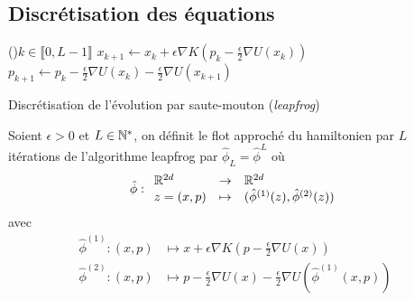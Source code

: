 \documentclass[10pt,a4paper]{article}
\begin{document}
\subsection{Discrétisation des équations}




\begin{center}
	\begin{algorithm}[H]
		\For(){$k \in \llbracket 0, L-1 \rrbracket$}{
			$x_{k+1} \leftarrow x_k + \epsilon \nabla K \left( p_k - \frac{\epsilon}{2} \nabla U(x_k) \right)$\;
			$p_{k+1} \leftarrow p_k - \frac{\epsilon}{2} \nabla U(x_k) - \frac{\epsilon}{2} \nabla U(x_{k+1})$\;
		}
		\caption{Discrétisation de l'évolution par saute-mouton (\emph{leapfrog})}
		\label{algo:leapfrog}
	\end{algorithm}
\end{center}

\begin{Def} \label{def:flot_approche}
	Soient $\epsilon > 0$ et $L \in \mathbb{N}^*$, on définit le flot approché du hamiltonien par $L$ itérations de l'algorithme leapfrog par $\hat{\phi}_L = \hat{\phi}^L$ où 
	$$
	\hat{\phi} : { \begin{array}{lcl} \mathbb{R}^{2d} & \to & \mathbb{R}^{2d} \\
	z = (x, p) & \mapsto & (\hat{\phi}^{(1)}(z), \hat{\phi}^{(2)}(z))
	 \end{array} }
	$$
	avec
	\begin{align*}
	\hat{\phi}^{(1)} : (x,p) & \mapsto x + \epsilon \nabla K \left( p - \frac{\epsilon}{2} \nabla U(x) \right) \\
	\hat{\phi}^{(2)} : (x,p) & \mapsto p - \frac{\epsilon}{2} \nabla U(x) - \frac{\epsilon}{2} \nabla U(\hat{\phi}^{(1)}(x,p))
	\end{align*}
\end{Def}
\end{document}

